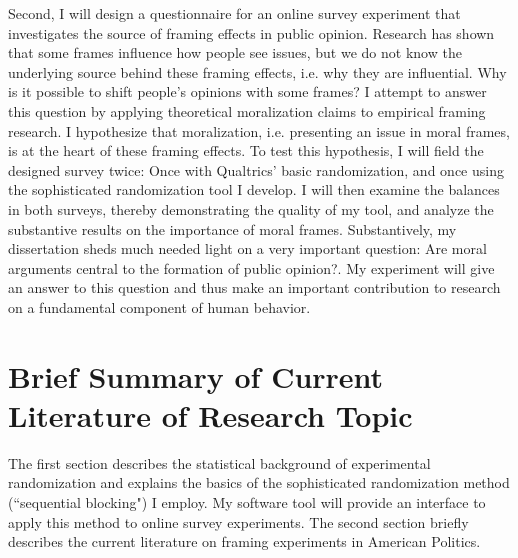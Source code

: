 \documentclass[11pt]{article}
\begin{document}
Second, I will design a questionnaire for an online survey experiment that investigates the source of framing effects in public opinion. Research has shown that some frames influence how people see issues, but we do not know the underlying source behind these framing effects, i.e. why they are influential. Why is it possible to shift people's opinions with some frames? I attempt to answer this question by applying theoretical moralization claims to empirical framing research. I hypothesize that moralization, i.e. presenting an issue in moral frames, is at the heart of these framing effects. To test this hypothesis, I will field the designed survey twice: Once with Qualtrics' basic randomization, and once using the sophisticated randomization tool I develop. I will then examine the balances in both surveys, thereby demonstrating the quality of my tool, and analyze the substantive results on the importance of moral frames. Substantively, my dissertation sheds much needed light on a very important question: Are moral arguments central to the formation of public opinion?. My experiment will give an answer to this question and thus make an important contribution to research on a fundamental component of human behavior.






\section*{Brief Summary of Current Literature of Research Topic}

\vspace{0.3cm}

The first section describes the statistical background of experimental randomization and explains the basics of the sophisticated randomization method (``sequential blocking") I employ. My software tool will provide an interface to apply this method to online survey experiments. The second section briefly describes the current literature on framing experiments in American Politics.

\vspace{0.3cm}
\end{document}

